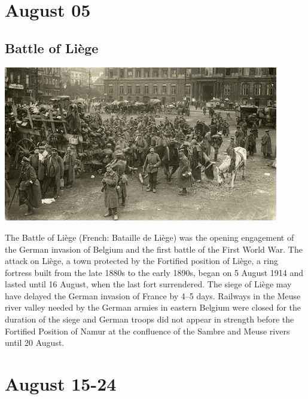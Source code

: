\documentclass[11pt]{report}
\begin{document}
\section{August 05}
\subsection{Battle of Liège}
\vspace{2mm}\begin{center}\includegraphics[width=12cm]{./img/battleOfLiege.png}\end{center}
The Battle of Liège (French: Bataille de Liège) was the opening engagement of the German invasion of Belgium and the first battle of the First World War. The attack on Liège, a town protected by the Fortified position of Liège, a ring fortress built from the late 1880s to the early 1890s, began on 5 August 1914 and lasted until 16 August, when the last fort surrendered. The siege of Liège may have delayed the German invasion of France by 4–5 days. Railways in the Meuse river valley needed by the German armies in eastern Belgium were closed for the duration of the siege and German troops did not appear in strength before the Fortified Position of Namur at the confluence of the Sambre and Meuse rivers until 20 August.

\section{August 15-24}
\end{document}
